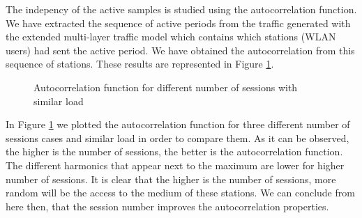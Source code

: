 The indepency of the active samples is studied using the autocorrelation function. We have extracted the sequence of active periods from the traffic generated with the extended multi-layer traffic model which contains which stations (\acs{WLAN} users) had sent the active period. We have obtained the autocorrelation from this sequence of stations. These results are represented in Figure \ref{fig:autocorrelation_sessions}.

\begin{figure}[h!]
	\centering
	\caption{Autocorrelation function for different number of sessions with similar load}
	\label{fig:autocorrelation_sessions}
\end{figure}

In Figure \ref{fig:autocorrelation_sessions} we plotted the autocorrelation function for three different number of sessions cases and similar load in order to compare them. As it can be observed, the higher is the number of sessions, the better is the autocorrelation function. The different harmonics that appear next to the maximum are lower for higher number of sessions. It is clear that the higher is the number of sessions, more random will be the access to the medium of these stations. We can conclude from here then, that the session number improves the autocorrelation properties.

